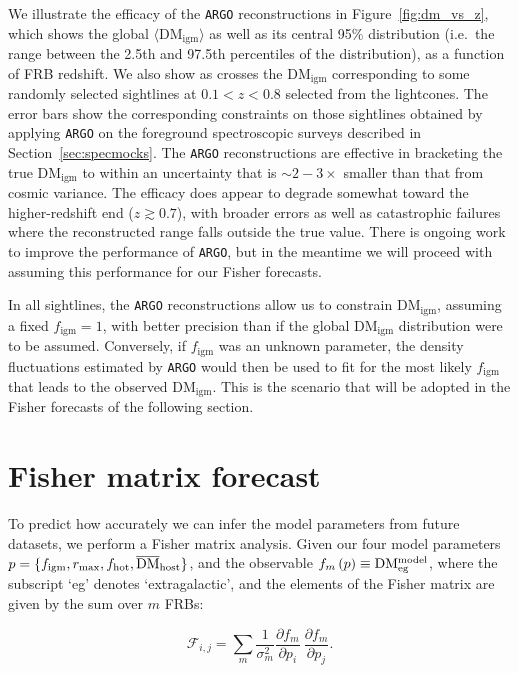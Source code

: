\documentclass[twocolumn]{aastex63}
\newcommand{\dmigm}{\ensuremath{\mathrm{DM}_\mathrm{igm}}}
\newcommand{\bardmhost}{\ensuremath{\overline{\mathrm{DM}}_\mathrm{host}}}
\newcommand{\figm}{\ensuremath{f_\mathrm{igm}}}
\newcommand{\argo}{\texttt{ARGO}}
\begin{document}
\begin{CJK*}{UTF8}{gbsn}
We illustrate the efficacy of the \argo{} reconstructions in Figure~\ref{fig:dm_vs_z}, which shows the global $\langle \dmigm \rangle$ as well as its
central 95\% distribution (i.e.\ the range between the 2.5th and 97.5th percentiles of the distribution), as a function of FRB redshift. We also show as crosses the \dmigm{} corresponding to some randomly selected sightlines at $0.1<z<0.8$ selected from the lightcones. The error bars
show the corresponding constraints on those sightlines obtained by applying \argo{} on the foreground spectroscopic surveys described in Section~\ref{sec:specmocks}. 
The \argo{} reconstructions are effective in bracketing the true \dmigm{} to within an uncertainty that is $\sim 2-3\times$ smaller than that from cosmic variance.
The efficacy does appear to degrade somewhat toward the higher-redshift end ($z\gtrsim 0.7$), with broader errors as well as catastrophic failures where the
reconstructed range falls outside the true value. There is ongoing work to improve the performance of \argo{}, but in the meantime we will proceed with
assuming this performance for our Fisher forecasts.

In all sightlines, the \argo{} reconstructions allow us to constrain \dmigm{}, assuming a fixed $\figm = 1$, with better precision than if the global
\dmigm{} distribution were to be assumed. Conversely, if \figm{} was an unknown parameter, the density fluctuations estimated by \argo{} would then be used
to fit for the most likely \figm{} that leads to the observed \dmigm{}. This is the scenario that will be adopted in the Fisher forecasts
of the following section.


\section{Fisher matrix forecast}
\label{sec:fisher}


To predict how accurately we can infer the model parameters from future datasets, we perform a Fisher matrix analysis. Given our four model parameters $p = \{ f_{\rm igm}, r_{\rm max}, f_{\rm hot}, \bardmhost \}$, and the observable $f_m\left( p \right) \equiv {\rm DM^{model}_{eg}}$,
where the subscript `eg' denotes `extragalactic', and the elements of the Fisher matrix are given by the sum over $m$ FRBs:

\begin{equation}\label{eq:fisher}
    \mathcal{F}_{i,j} = \sum_m \frac{1}{\sigma_m^2}\frac{\partial f_m }{\partial p_i}~\frac{\partial f_m }{\partial p_j}.
\end{equation}



\end{CJK*}
\end{document}
